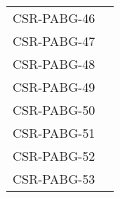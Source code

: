 \begin{longtable}{|p{1.5cm}|p{12cm}|@{}}
\begin{minipage}{12cm}
\end{minipage}\\
\hline
CSR-PABG-46&
\begin{minipage}{12cm}
\end{minipage}\\
\hline
CSR-PABG-47&
\begin{minipage}{12cm}
\end{minipage}\\
\hline
CSR-PABG-48&
\begin{minipage}{12cm}
\end{minipage}\\
\hline
CSR-PABG-49&
\begin{minipage}{12cm}
\end{minipage}\\
\hline
CSR-PABG-50&
\begin{minipage}{12cm}
\end{minipage}\\
\hline
CSR-PABG-51&
\begin{minipage}{12cm}
\end{minipage}\\
\hline
CSR-PABG-52&
\begin{minipage}{12cm}
\end{minipage}\\
\hline
CSR-PABG-53&
\begin{minipage}{12cm}
\end{minipage}\\
\hline



\bottomrule                                                             
\end{longtable}
\normalsize

\clearpage